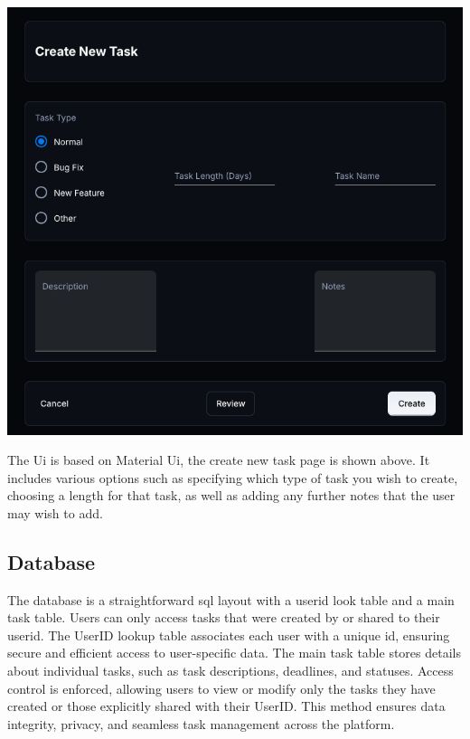 \documentclass{article}
\begin{document}
\includegraphics[width=0.9\linewidth]{./logo/mockup.png} 

The Ui is based on Material Ui\cite{mui}, the create new task page is shown above. It includes various options such as specifying which type of task you wish to create, choosing a length for that task, as well as adding any further notes that the user may wish to add.

\subsection{Database}
The database is a straightforward \Gls{sql} layout with a userid look table and a main task table. Users can only access tasks that were created by or shared to their userid. The UserID lookup table associates each user with a unique id, ensuring secure and efficient access to user-specific data. The main task table stores details about individual tasks, such as task descriptions, deadlines, and statuses. Access control is enforced, allowing users to view or modify only the tasks they have created or those explicitly shared with their UserID. This method ensures data integrity, privacy, and seamless task management across the platform.


\pagebreak
\printglossaries

\printbibliography
\end{document}
